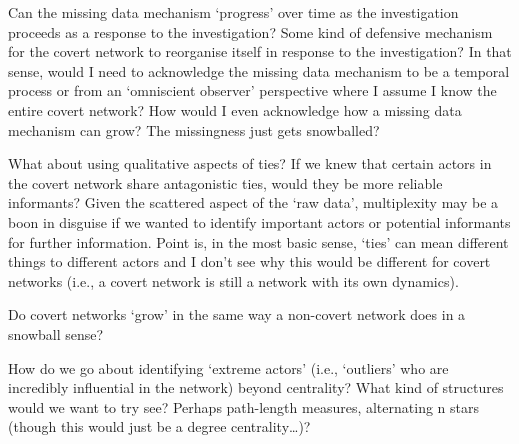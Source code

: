 \documentclass[
]{article}
\begin{document}
Can the missing data mechanism `progress' over time as the investigation
proceeds as a response to the investigation? Some kind of defensive
mechanism for the covert network to reorganise itself in response to the
investigation? In that sense, would I need to acknowledge the missing
data mechanism to be a temporal process or from an `omniscient observer'
perspective where I assume I know the entire covert network? How would I
even acknowledge how a missing data mechanism can grow? The missingness
just gets snowballed?

What about using qualitative aspects of ties? If we knew that certain
actors in the covert network share antagonistic ties, would they be more
reliable informants? Given the scattered aspect of the `raw data',
multiplexity may be a boon in disguise if we wanted to identify
important actors or potential informants for further information. Point
is, in the most basic sense, `ties' can mean different things to
different actors and I don't see why this would be different for covert
networks (i.e., a covert network is still a network with its own
dynamics).

Do covert networks `grow' in the same way a non-covert network does in a
snowball sense?

How do we go about identifying `extreme actors' (i.e., `outliers' who
are incredibly influential in the network) beyond centrality? What kind
of structures would we want to try see? Perhaps path-length measures,
alternating n stars (though this would just be a degree
centrality\ldots)?
\end{document}
